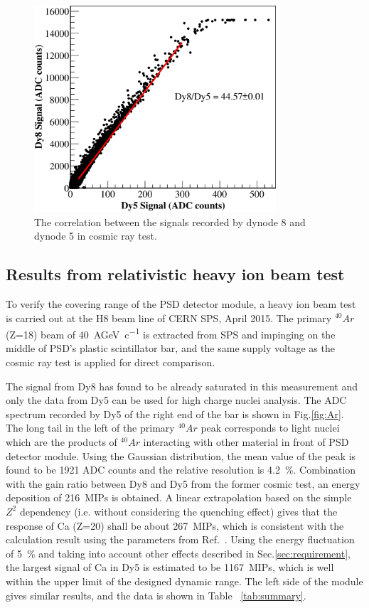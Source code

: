 \documentclass[preprint, times]{elsarticle}
\begin{document}
\begin{figure}
    \centering
    \includegraphics[width=90mm]{dy58}
    \caption{The correlation between the signals recorded by dynode 8 and dynode 5 in cosmic ray test.}
    \label{fig:dy58}
\end{figure}

\subsection{Results from relativistic heavy ion beam test}
\label{sec:beam}
To verify the covering range of the PSD detector module, a heavy ion beam test is carried out at the H8 beam line of CERN SPS, April 2015.
The primary $^{40}{Ar}$ (Z=18) beam of \SI{40}{AGeV\per c} is extracted from SPS and impinging on the middle of PSD's plastic scintillator bar, and the same supply voltage as the cosmic ray test is applied for direct comparison.

The signal from Dy8 has found to be already saturated in this measurement and only the data from Dy5 can be used for high charge nuclei analysis.
The ADC spectrum recorded by Dy5 of the right end of the bar is shown in Fig.\ref{fig:Ar}.
The long tail in the left of the primary $^{40}Ar$ peak corresponds to light nuclei which are the products of $^{40}Ar$ interacting with other material in front of PSD detector module.
Using the Gaussian distribution, the mean value of the peak is found to be 1921 ADC counts and the relative resolution is \SI{4.2}{\percent}.
 Combination with the gain ratio between  Dy8 and Dy5 from the former cosmic test, an energy deposition of \SI{216}{MIPs} is obtained. A linear extrapolation based on the simple $Z^2$ dependency (i.e. without considering the quenching effect) gives that the response of Ca (Z=20) shall be about \SI{267}{MIPs}, which is consistent with the calculation result using the parameters from Ref.~\cite{bindi2005performance}. Using the energy fluctuation of \SI{5}{\percent} and taking into account other effects described in Sec.\ref{sec:requirement}, the largest signal of Ca in Dy5 is estimated to be \SI{1167}{MIPs}, which is well within the upper limit of the designed dynamic range. The left side of the module gives similar results, and the data is shown in Table ~\ref{tab:summary}.
\end{document}
